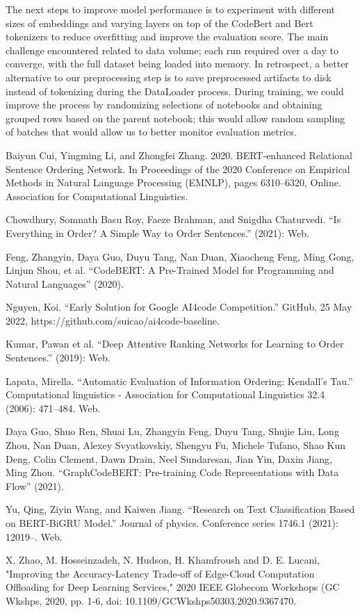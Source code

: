 \documentclass[conference]{IEEEtran}
\begin{document}
The next steps to improve model performance is to experiment with different sizes of embeddings and varying layers on top of the CodeBert and Bert tokenizers to reduce overfitting and improve the evaluation score. The main challenge encountered related to data volume; each run required over a day to converge, with the full dataset being loaded into memory. In retrospect, a better alternative to our preprocessing step is to save preprocessed artifacts to disk instead of tokenizing during the DataLoader process. During training, we could improve the process by randomizing selections of notebooks and obtaining grouped rows based on the parent notebook; this would allow random sampling of batches that would allow us to better monitor evaluation metrics.

\begin{thebibliography}{9}

Baiyun Cui, Yingming Li, and Zhongfei Zhang. 2020. BERT-enhanced Relational Sentence Ordering Network. In Proceedings of the 2020 Conference on Empirical Methods in Natural Language Processing (EMNLP), pages 6310–6320, Online. Association for Computational Linguistics.

Chowdhury, Somnath Basu Roy, Faeze Brahman, and Snigdha Chaturvedi. “Is Everything in Order? A Simple Way to Order Sentences.” (2021): Web.

Feng, Zhangyin, Daya Guo, Duyu Tang, Nan Duan, Xiaocheng Feng, Ming Gong, Linjun Shou, et al. “CodeBERT: A Pre-Trained Model for Programming and Natural Languages” (2020).

Nguyen, Koi. “Early Solution for Google AI4code Competition.” GitHub, 25 May 2022, https://github.com/suicao/ai4code-baseline.

Kumar, Pawan et al. “Deep Attentive Ranking Networks for Learning to Order Sentences.” (2019): Web.

Lapata, Mirella. “Automatic Evaluation of Information Ordering: Kendall’s Tau.” Computational linguistics - Association for Computational Linguistics 32.4 (2006): 471–484. Web.

Daya Guo, Shuo Ren, Shuai Lu, Zhangyin Feng, Duyu Tang, Shujie Liu, Long Zhou, Nan Duan, Alexey Svyatkovskiy, Shengyu Fu, Michele Tufano, Shao Kun Deng, Colin Clement, Dawn Drain, Neel Sundaresan, Jian Yin, Daxin Jiang, Ming Zhou. “GraphCodeBERT: Pre-training Code Representations with Data Flow” (2021).

Yu, Qing, Ziyin Wang, and Kaiwen Jiang. “Research on Text Classification Based on BERT-BiGRU Model.” Journal of physics. Conference series 1746.1 (2021): 12019–. Web.

X. Zhao, M. Hosseinzadeh, N. Hudson, H. Khamfroush and D. E. Lucani, "Improving the Accuracy-Latency Trade-off of Edge-Cloud Computation Offloading for Deep Learning Services," 2020 IEEE Globecom Workshops (GC Wkshps, 2020, pp. 1-6, doi: 10.1109/GCWkshps50303.2020.9367470.

\end{thebibliography}
\end{document}
